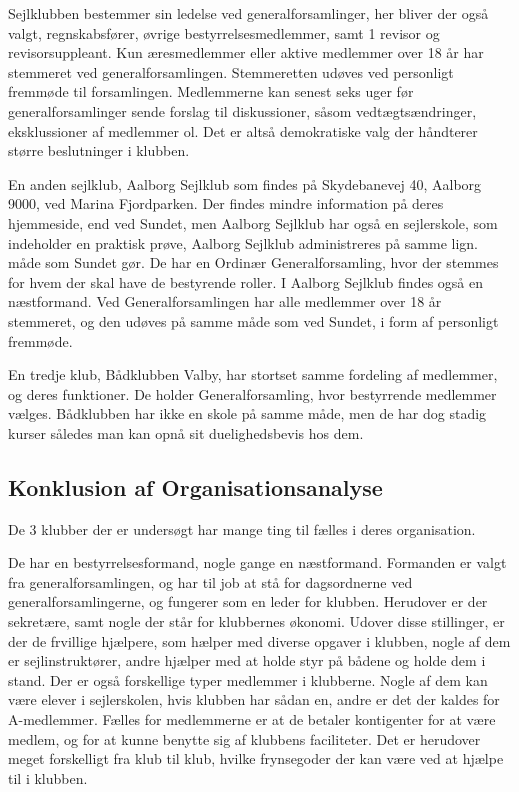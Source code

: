 Sejlklubben bestemmer sin ledelse ved generalforsamlinger, her bliver der også valgt, regnskabsfører, øvrige
bestyrrelsesmedlemmer, samt 1 revisor og revisorsuppleant. Kun æresmedlemmer eller aktive medlemmer over 18 år har
stemmeret ved generalforsamlingen. Stemmeretten udøves ved personligt fremmøde til forsamlingen. Medlemmerne kan senest
seks uger før generalforsamlinger sende forslag til diskussioner, såsom vedtægtsændringer, eksklussioner af medlemmer ol.
Det er altså demokratiske valg der håndterer større beslutninger i klubben.

En anden sejlklub, Aalborg Sejlklub som findes på Skydebanevej 40, Aalborg 9000, ved Marina Fjordparken. Der findes
mindre information på deres hjemmeside, end ved Sundet, men Aalborg Sejlklub har også en sejlerskole, som indeholder en
praktisk prøve,  Aalborg Sejlklub administreres på samme lign. måde som Sundet gør. De har en
Ordinær Generalforsamling, hvor der stemmes for hvem der skal have de bestyrende roller. I Aalborg Sejlklub findes også en næstformand. Ved Generalforsamlingen har alle medlemmer over 18
år stemmeret, og den udøves på samme måde som ved Sundet, i form af personligt fremmøde.\citep{AalborgSejlklub}

En tredje klub, Bådklubben Valby, har stortset samme fordeling af medlemmer, og deres funktioner. De holder Generalforsamling, hvor bestyrrende medlemmer vælges. Bådklubben har ikke en skole på samme måde, men de har dog stadig kurser således man kan opnå sit duelighedsbevis hos dem.\citep{BaadklubbenValby}


\subsection{Konklusion af Organisationsanalyse}

De 3 klubber der er undersøgt har mange ting til fælles i deres organisation.

De har en bestyrrelsesformand, nogle gange en næstformand. Formanden er valgt fra generalforsamlingen, og har til job at stå for dagsordnerne ved generalforsamlingerne, og fungerer som en leder for klubben. Herudover er der sekretære, samt nogle der står for klubbernes økonomi. Udover disse stillinger, er der de frvillige hjælpere, som hælper med diverse opgaver i klubben, nogle af dem er sejlinstruktører, andre hjælper med at holde styr på bådene og holde dem i stand. Der er også forskellige typer medlemmer i klubberne. Nogle af dem kan være elever i sejlerskolen, hvis klubben har sådan en, andre er det der kaldes for A-medlemmer.
Fælles for medlemmerne er at de betaler kontigenter for at være medlem, og for at kunne benytte sig af klubbens faciliteter. Det er herudover meget forskelligt fra klub til klub, hvilke frynsegoder der kan være ved at hjælpe til i klubben.

